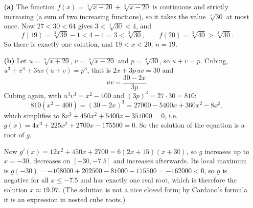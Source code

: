 \textbf{(a)} The function $f(x)=\sqrt[3]{x+20}+\sqrt[3]{x-20}$ is continuous and strictly increasing (a sum of two increasing functions), so it takes the value $\sqrt[3]{30}$ at most once. Now $27<30<64$ gives $3<\sqrt[3]{30}<4$, and
\[
f(19)=\sqrt[3]{39}-1<4-1=3<\sqrt[3]{30},\qquad f(20)=\sqrt[3]{40}>\sqrt[3]{30}.
\]
So there is exactly one solution, and $19<x<20$: $n=\boxed{19}$.

\textbf{(b)} Let $u=\sqrt[3]{x+20}$, $v=\sqrt[3]{x-20}$ and $p=\sqrt[3]{30}$, so $u+v=p$. Cubing, $u^3+v^3+3uv(u+v)=p^3$, that is $2x+3p\,uv=30$ and
\[
uv=\dfrac{30-2x}{3p}.
\]
Cubing again, with $u^3v^3=x^2-400$ and $(3p)^3=27\cdot30=810$:
\[
810\left(x^2-400\right)=(30-2x)^3=27000-5400x+360x^2-8x^3,
\]
which simplifies to $8x^3+450x^2+5400x-351000=0$, i.e. $g(x)=4x^3+225x^2+2700x-175500=0$. So the solution of the equation is a root of $g$.

Now $g'(x)=12x^2+450x+2700=6(2x+15)(x+30)$, so $g$ increases up to $x=-30$, decreases on $[-30,-7.5]$ and increases afterwards. Its local maximum is $g(-30)=-108000+202500-81000-175500=-162000<0$, so $g$ is negative for all $x\le-7.5$ and has exactly one real root, which is therefore the solution $x\approx19.97$. (The solution is not a nice closed form; by Cardano's formula it is an expression in nested cube roots.)
